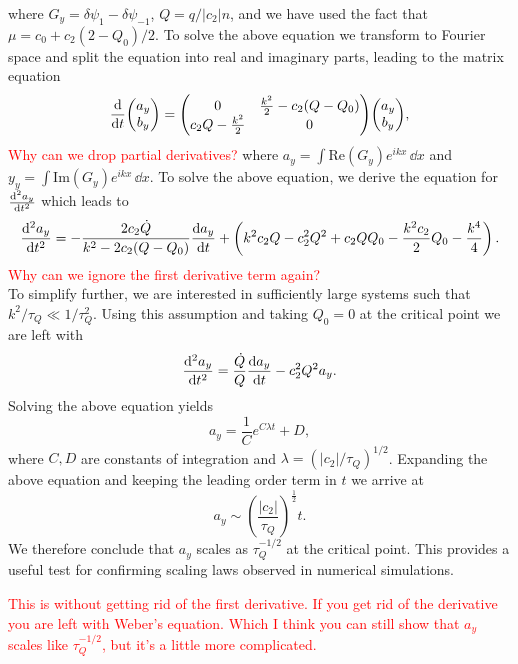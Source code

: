 where \( G_y = \delta\psi_1 - \delta\psi_{-1} \), \( Q=q/|c_2|n \), and we have
used the fact that \( \mu = c_0 + c_2(2-Q_0)/2 \).
To solve the above equation we transform to Fourier space and split the equation
into real and imaginary parts, leading to the matrix equation
\begin{equation}
    \dv{t} \mqty(a_y \\ b_y) = \mqty(0 & \frac{k^2}{2}-c_2(Q-Q_0) \\
    c_2Q - \frac{k^2}{2} & 0)
    \mqty(a_y \\ b_y),
\end{equation}
\textcolor{red}{Why can we drop partial derivatives?}
where \( a_y = \int \mathrm{Re}(G_y)e^{ikx} \, \dd x \) and
\( y_y = \int \mathrm{Im}(G_y)e^{ikx} \, \dd x \).
To solve the above equation, we derive the equation for \( \dv[2]{a_y}{t} \)
which leads to
\begin{equation}
    \dv[2]{a_y}{t} = -\frac{2c_2\dot{Q}}{k^2 - 2c_2(Q-Q_0)}\dv{a_y}{t}
    + \left(k^2c_2Q - c_2^2Q^2 + c_2QQ_0 - \frac{k^2c_2}{2}Q_0
    - \frac{k^4}{4}\right).
\end{equation}
\textcolor{red}{Why can we ignore the first derivative term again?}\\
To simplify further, we are interested in sufficiently large systems such that
\( k^2/\tau_Q \ll 1 / \tau_Q^2 \).
Using this assumption and taking \(Q_0=0 \) at the critical point we are left
with
\begin{equation}
    \dv[2]{a_y}{t} = \frac{\dot{Q}}{Q}\dv{a_y}{t} - c_2^2Q^2a_y.
\end{equation}
Solving the above equation yields
\begin{equation}
    a_y = \frac{1}{C}e^{C\lambda t} + D,
\end{equation}
where \( C, D \) are constants of integration and
\( \lambda ={(|c_2|/\tau_Q)}^{1/2} \).
Expanding the above equation and keeping the leading order term in \( t \) we
arrive at
\begin{equation}
    a_y \sim {\left(\frac{|c_2|}{\tau_Q}\right)}^{\frac{1}{2}}t.
\end{equation}
We therefore conclude that \( a_y \) scales as \( \tau_Q^{-1/2} \) at the
critical point.
This provides a useful test for confirming scaling laws observed in numerical
simulations.

\textcolor{red}{This is without getting rid of the first derivative.
    If you get rid of the derivative you are left with Weber's equation. Which
    I think you can still show that \( a_y \) scales like \( \tau_Q^{-1/2} \),
    but it's a little more complicated.}

